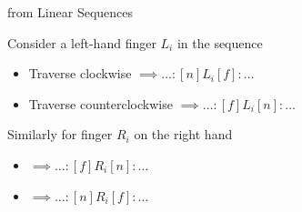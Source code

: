 \begin{frame}{\subsecname from Linear Sequences}
\begin{adjustwidth}{-1.5em}{-1.5em}
Consider a left-hand finger $L_i$ in the sequence

\begin{itemize}
    \item Traverse clockwise  $\implies \ldots:[n] L_i [f]:\ldots$
    \item Traverse counterclockwise  $\implies\ldots: [f] L_i [n]:\ldots$
\end{itemize}

Similarly for finger $R_i$ on the right hand

\begin{itemize}
    \item {} $\implies \ldots:[f]R_i[n]:\ldots$
    \item{} $\implies\ldots:[n]R_i[f]:\ldots$
\end{itemize}
\end{adjustwidth}
\end{frame}


